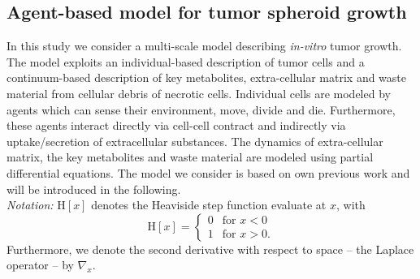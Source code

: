 \documentclass[10pt,letterpaper]{article}
\newcommand{\Heaviside}[1]{{\mathrm{H}\!\left[#1\right]}}
\begin{document}
\subsection*{Agent-based model for tumor spheroid growth}
In this study we consider a multi-scale model describing \textit{in-vitro} tumor growth. The model exploits an individual-based description of tumor cells and a continuum-based description of key metabolites, extra-cellular matrix and waste material from cellular debris of necrotic cells. Individual cells are modeled by agents which can sense their environment, move, divide and die. Furthermore, these agents interact directly via cell-cell contract and indirectly via uptake/secretion of extracellular substances. The dynamics of extra-cellular matrix, the key metabolites and waste material are modeled using partial differential equations. The model we consider is based on own previous work \cite{JagiellaMul2015} and will be introduced in the following.
\\[2ex]
\noindent \textit{Notation:} $\Heaviside{x}$ denotes the Heaviside step function evaluate at $x$, with 
\begin{equation*}
\Heaviside{x} =  \left\{\begin{array}{ll}0 & \text{for } x < 0 \\ 1  &\text{for } x > 0. \end{array}\right.
\end{equation*}
Furthermore, we denote the second derivative with respect to space -- the Laplace operator -- by $\nabla_x$.

\end{document}

